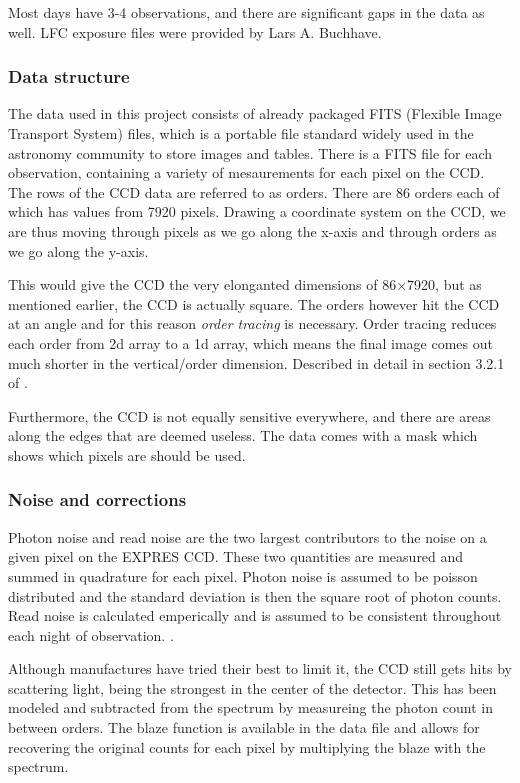 Most days have 3-4 observations, and there are significant gaps in the data as well. LFC exposure files were provided by Lars A. Buchhave. 

\subsubsection{Data structure}
The data used in this project consists of already packaged FITS (Flexible Image Transport System) files, which is a portable file standard widely used in the astronomy community to store images and tables. There is a FITS file for each observation, containing a variety of mesaurements for each pixel on the CCD. 
The rows of the CCD data are referred to as orders. There are 86 orders each of which has values from 7920 pixels. Drawing a coordinate system on the CCD, we are thus moving through pixels as we go along the x-axis and through orders as we go along the y-axis.

This would give the CCD the very elonganted dimensions of 86$\times$7920, but as mentioned earlier, the CCD is actually square. The orders however hit the CCD at an angle and for this reason \emph{order tracing} is necessary. Order tracing reduces each order from 2d array to a 1d array, which means the final image comes out much shorter in the vertical/order dimension. Described in detail in section 3.2.1 of \cite{first_RV_from_EXPRES}.

Furthermore, the CCD is not equally sensitive everywhere, and there are areas along the edges that are deemed useless. The data comes with a mask which shows which pixels are should be used. 

\subsubsection{Noise and corrections}
Photon noise and read noise are the two largest contributors to the noise on a given pixel on the EXPRES CCD. These two quantities are measured and summed in quadrature for each pixel. Photon noise is assumed to be poisson distributed and the standard deviation is then the square root of photon counts. Read noise is calculated emperically and is assumed to be consistent throughout each night of observation. \cite{first_RV_from_EXPRES}. 

Although manufactures have tried their best to limit it, the CCD still gets hits by scattering light, being the strongest in the center of the detector. This has been modeled and subtracted from the spectrum by measureing the photon count in between orders. The blaze function is available in the data file and allows for recovering the original counts for each pixel by multiplying the blaze with the spectrum.

